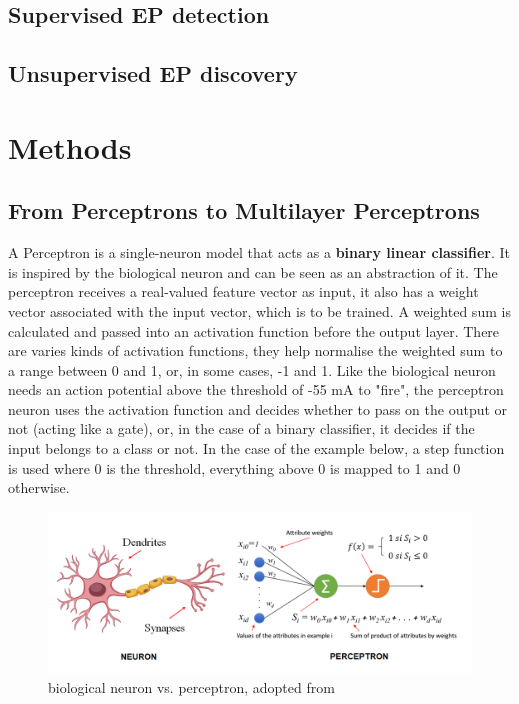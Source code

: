 \documentclass[nobib]{tufte-handout}
\begin{document}
\subsection{Supervised EP detection}
\noindent
\subsection{Unsupervised EP discovery}

\bigskip
\section{Methods}
\subsection{\textbf{From Perceptrons to Multilayer Perceptrons}}

A Perceptron is a single-neuron model that acts as a \textbf{binary linear classifier}. It is inspired by the biological neuron and can be seen as an abstraction of it. The perceptron receives a real-valued feature vector as input, it also has a weight vector associated with the input vector, which is to be trained. A weighted sum is calculated and passed into an activation function before the output layer. There are varies kinds of activation functions, they help normalise the weighted sum to a range between 0 and 1, or, in some cases, -1 and 1. Like the biological neuron needs an action potential above the threshold of -55 mA to "fire", the perceptron neuron uses the activation function and decides whether to pass on the output or not (acting like a gate), or, in the case of a binary classifier, it decides if the input belongs to a class or not. In the case of the example below, a step function is used where 0 is the threshold, everything above 0 is mapped to 1 and 0 otherwise. 
\begin{figure}
  \includegraphics{perceptron1.png}
  \caption{biological neuron vs. perceptron, adopted from \cite{IF:perceptron}}
\end{figure}
\end{document}
